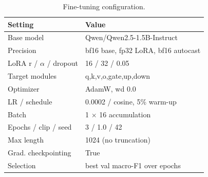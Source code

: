 \begin{table}[t]
\centering
\footnotesize
\caption{Fine-tuning configuration.}
\label{tab:hparams}
\begin{tabular}{ll}
\toprule
Setting & Value \\
\midrule
Base model & Qwen/Qwen2.5-1.5B-Instruct \\
Precision & bf16 base, fp32 LoRA, bf16 autocast \\
LoRA r / $\alpha$ / dropout & 16 / 32 / 0.05 \\
Target modules & q,k,v,o,gate,up,down \\
Optimizer & AdamW, wd 0.0 \\
LR / schedule & 0.0002 / cosine, 5\% warm-up \\
Batch & 1 $\times$ 16 accumulation \\
Epochs / clip / seed & 3 / 1.0 / 42 \\
Max length & 1024 (no truncation) \\
Grad. checkpointing & True \\
Selection & best val macro-F1 over epochs \\
\bottomrule
\end{tabular}
\end{table}

